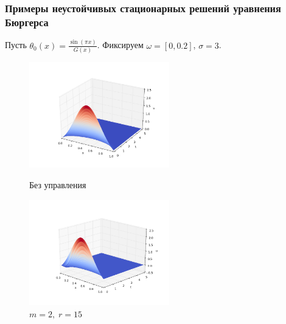 \documentclass{beamer}
\begin{document}
\begin{frame}
\frametitle{Примеры неустойчивых стационарных решений уравнения Бюргерса}

Пусть $\theta_0(x) = \frac{\sin(\pi x)}{G(x)}$. Фиксируем $\omega = [0, 0.2]$, $\sigma = 3$. 


\begin{figure}[H]
\centering
\begin{minipage}{.5\textwidth}
  \centering
  \includegraphics[width=2.4in]{ex_s3}
  \caption{Без управления}
  \label{fig:test1}
\end{minipage}%
\begin{minipage}{.5\textwidth}
  \centering
  \includegraphics[width=2.4in]{re_s3}
  \caption{$m = 2, \; r = 15$}
  \label{fig:test2}
\end{minipage}
\end{figure}

\end{frame}
\end{document}

